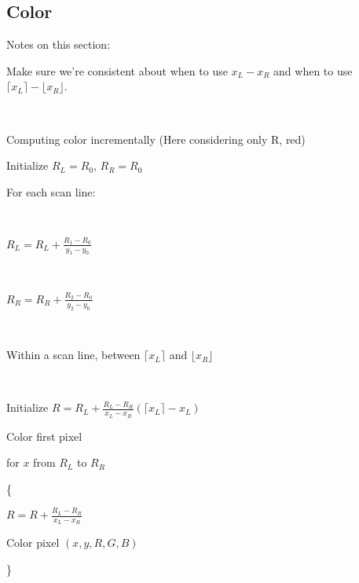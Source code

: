 \subsection{Color}

{\color{red}
	Notes on this section:  
	
	Make sure we're consistent about when to use $x_L - x_R$ and when to use $\lceil x_L \rceil - \lfloor x_R \rfloor$.
}

\

Computing color incrementally (Here considering only R, red)

Initialize $R_L = R_0$, $R_R = R_0$

For each scan line:

\

\qquad $\displaystyle R_L = R_L + \frac{R_1 - R_0}{y_1 - y_0}$

\

\qquad $\displaystyle R_R = R_R + \frac{R_2 - R_0}{y_2 - y_0}$

\

Within a scan line, between $\lceil x_L \rceil$ and $\lfloor  x_R \rfloor$

\

\qquad Initialize $\displaystyle R = R_L + \frac{R_L - R_R}{x_L - x_R} \left( \lceil x_L \rceil - x_L \right)$

\qquad Color first pixel

\qquad for $x$ from $R_L$ to $R_R$

\qquad \{

\qquad \qquad $\displaystyle R = R + \frac{R_L - R_R}{ x_L  - x_R  } $

\qquad {}

\qquad \qquad Color pixel $(x, y, R, G, B)$

\qquad \}

